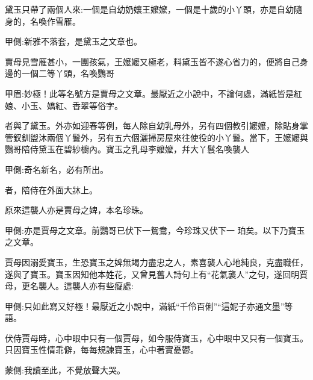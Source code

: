 \begin{parag}
    黛玉只帶了兩個人來:一個是自幼奶孃王嬤嬤，一個是十歲的小丫頭，亦是自幼隨身的，名喚作雪雁。\begin{note}甲側:新雅不落套，是黛玉之文章也。\end{note}賈母見雪雁甚小，一團孩氣，王嬤嬤又極老，料黛玉皆不遂心省力的，便將自己身邊的一個二等丫頭，名喚鸚哥\begin{note}甲眉:妙極！此等名號方是賈母之文章。最厭近之小說中，不論何處，滿紙皆是紅娘、小玉、嬌紅、香翠等俗字。\end{note}者與了黛玉。外亦如迎春等例，每人除自幼乳母外，另有四個教引嬤嬤，除貼身掌管釵釧盥沐兩個丫鬟外，另有五六個灑掃房屋來往使役的小丫鬟。當下，王嬤嬤與鸚哥陪侍黛玉在碧紗櫥內。寶玉之乳母李嬤嬤，幷大丫鬟名喚襲人\begin{note}甲側:奇名新名，必有所出。\end{note}者，陪侍在外面大牀上。
\end{parag}


\begin{parag}
    原來這襲人亦是賈母之婢，本名珍珠。\begin{note}甲側:亦是賈母之文章。前鸚哥已伏下一鴛鴦，今珍珠又伏下一  珀矣。以下乃寶玉之文章。\end{note}賈母因溺愛寶玉，生恐寶玉之婢無竭力盡忠之人，素喜襲人心地純良，克盡職任，遂與了寶玉。寶玉因知他本姓花，又曾見舊人詩句上有“花氣襲人”之句，遂回明賈母，更名襲人。這襲人亦有些癡處:\begin{note}甲側:只如此寫又好極！最厭近之小說中，滿紙“千伶百俐”“這妮子亦通文墨”等語。\end{note}伏侍賈母時，心中眼中只有一個賈母，如今服侍寶玉，心中眼中又只有一個寶玉。只因寶玉性情乖僻，每每規諫寶玉，心中著實憂鬱。\begin{note}蒙側:我讀至此，不覺放聲大哭。\end{note}
\end{parag}


